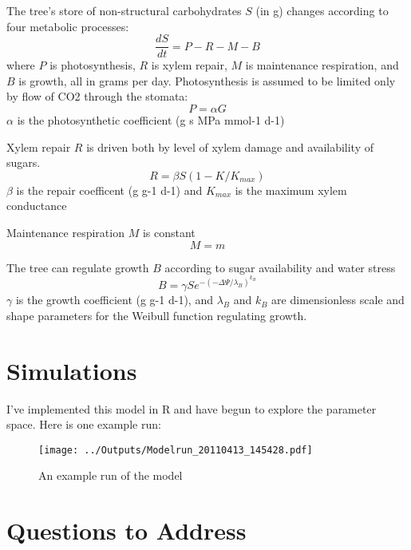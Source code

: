 \documentclass[12pt]{amsart}
\begin{document}
The tree's store of non-structural carbohydrates $S$ (in g) changes according to four metabolic processes:
\begin{equation}\label{dS}
\frac{dS}{dt} = P - R - M - B
\end{equation}
where $P$ is photosynthesis, $R$ is xylem repair, $M$ is maintenance respiration, and $B$ is growth, all in grams per day.  Photosynthesis is assumed to be limited only by flow of CO2 through the stomata:
\begin{equation}\label{P}
P = \alpha G
\end{equation}
$\alpha$ is the photosynthetic coefficient (g s MPa mmol-1 d-1)

Xylem repair $R$ is driven both by level of xylem damage and availability of sugars.
\begin{equation}\label{R}
R = \beta S (1 - K/K_{max})
 \end{equation}
 $\beta$ is the repair coefficent (g g-1 d-1) and $K_{max}$ is the maximum xylem conductance

Maintenance respiration $M$ is constant
\begin{equation}\label{M}
M = m
\end{equation}
 
The tree can regulate growth $B$ according to sugar availability and water stress
 \begin{equation}\label{B}
 B = \gamma S e^{-(-\Delta\Psi/\lambda_B)^{k_B}}
\end{equation}
$\gamma$ is the growth coefficient (g g-1 d-1), and $\lambda_B$ and $k_B$ are dimensionless scale and shape parameters for the Weibull function regulating growth.   
 
\section{Simulations}
I've implemented this model in R and have begun to explore the parameter space.  Here is one example run:

\begin{figure}[H]
\begin{center}
\texttt{[image: ../Outputs/Modelrun\_20110413\_145428.pdf]}
\caption{An example run of the model}
\label{example1}
\end{center}
\end{figure}


\section{Questions to Address}
 
\end{document}
